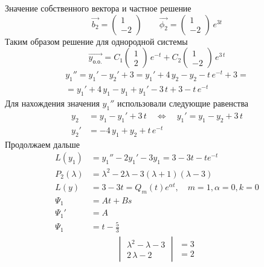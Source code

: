 \begin{Example}
\[    \]
    Значение собственного вектора и частное решение
    \[
        \vec{b_2}=\begin{pmatrix} 1 \\ -2 \end{pmatrix} \qquad \vec{\phi_2}=\begin{pmatrix} 1 \\  -2 \end{pmatrix}\,e^{3t}
    \]
    Таким образом решение для однородной системы
    \[
        \vec{y_{\text{о.о.}}}=C_1\begin{pmatrix} 1\\ 2\end{pmatrix}\,e^{-t} + C_2\begin{pmatrix} 1\\ - 2\end{pmatrix}\,e^{3\,t}
    \]
    \begin{multline*}
            y_1'' = y_1'- y_2' + 3 = y_1' + 4\,y_2 - y_2 - t\,e^{-t} + 3 = \\ 
            = y_1' + 4\,y_1 - y_1 + y_1' - 3\,t + 3 - t\,e^{-t}
    \end{multline*}
    Для нахождения значения $ y_1''$ использовали следующие равенства
    \begin{align*}
        y_2&= y_1 - y_1' + 3\,t \quad \Leftrightarrow \quad y_1' = y_1 - y_2 + 3\,t\\
        y_2'&= -4\,y_1 + y_2 + t\,e^{-t}
    \end{align*}
    Продолжаем дальше
    \begin{align*}
        L(y_1)&=y_1''-2y_1'-3y_1=3-3t-te^{-t}\\
        P_2(\lambda)&=\lambda^2-2\lambda-3(\lambda+1)(\lambda-3)\\
        L(y)&=3-3t=Q_m(t)e^{\alpha t}, \quad m =1,\alpha=0,k=0\\
        \Psi_1&=At+Bs\\
        \Psi_1'&=A\\
        \Psi_1&=t-\frac{5}{3}
    \end{align*}
    \begin{gather*}
        \begin{vmatrix} 
            \lambda^2 - \lambda - 3 \\ 2\,\lambda-2 \end{vmatrix} \begin{matrix}
            = 3 \\ = 2
        \end{matrix}
    \end{gather*}

\end{Example}
